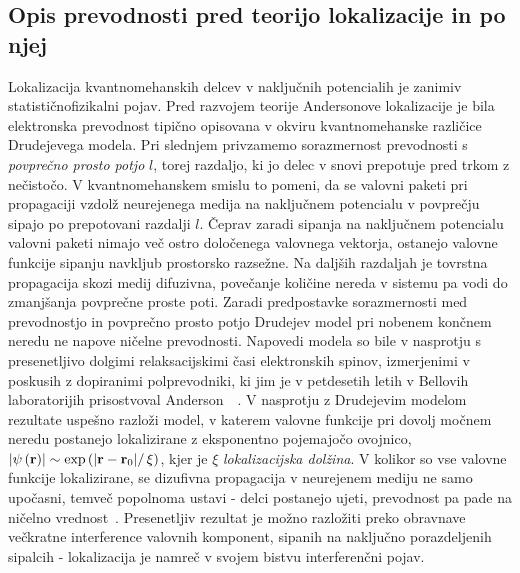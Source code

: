  \subsection{Opis prevodnosti pred teorijo lokalizacije in po njej}  
 Lokalizacija kvantnomehanskih delcev v naključnih potencialih je zanimiv statističnofizikalni pojav. Pred razvojem teorije Andersonove lokalizacije je bila elektronska prevodnost tipično opisovana v okviru kvantnomehanske različice Drudejevega modela. Pri slednjem privzamemo sorazmernost prevodnosti s \emph{povprečno prosto potjo} $l$, torej razdaljo, ki jo delec v snovi prepotuje pred trkom z nečistočo. V kvantnomehanskem smislu to pomeni, da se valovni paketi pri propagaciji vzdolž neurejenega medija na naključnem potencialu v povprečju sipajo po prepotovani razdalji $l$. Čeprav zaradi sipanja na naključnem potencialu valovni paketi nimajo več ostro določenega valovnega vektorja, ostanejo valovne funkcije sipanju navkljub prostorsko razsežne. Na daljših razdaljah je tovrstna propagacija skozi medij difuzivna, povečanje količine nereda v sistemu pa vodi do zmanjšanja povprečne proste poti. Zaradi predpostavke sorazmernosti med prevodnostjo in povprečno prosto potjo Drudejev model pri nobenem končnem neredu ne napove ničelne prevodnosti. Napovedi modela so bile v nasprotju s presenetljivo dolgimi relaksacijskimi časi elektronskih spinov, izmerjenimi v poskusih z dopiranimi polprevodniki, ki jim je v petdesetih letih v Bellovih laboratorijih prisostvoval Anderson~\cite{lagendijk2009fifty}~\cite{anderson1978local}. V nasprotju z Drudejevim modelom rezultate uspešno razloži model, v katerem valovne funkcije pri dovolj močnem neredu postanejo lokalizirane z eksponentno pojemajočo ovojnico, $\left|\psi\left(\textbf{r}\right)\right|   \sim \exp\left(\left|\textbf{r}- \textbf{r}_0\right|\right/\xi)$, kjer je $\xi$ \emph{lokalizacijska dolžina}. V kolikor so vse valovne funkcije lokalizirane, se dizufivna propagacija v neurejenem mediju ne samo upočasni, temveč popolnoma ustavi - delci postanejo ujeti, prevodnost pa pade na ničelno vrednost~\cite{wolfle2010self}. Presenetljiv rezultat je možno razložiti preko obravnave večkratne interference valovnih komponent, sipanih na naključno porazdeljenih sipalcih - lokalizacija je namreč v svojem bistvu interferenčni pojav. 
